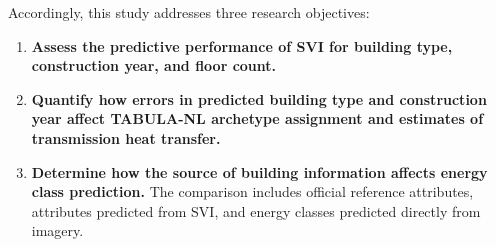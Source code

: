 Accordingly, this study addresses three research objectives:

\begin{enumerate}
	\item \textbf{Assess the predictive performance of \ac{SVI} for building type, construction year, and floor count.}

	\item \textbf{Quantify how errors in predicted building type and construction year affect TABULA-NL archetype assignment and estimates of transmission heat transfer.}

	\item \textbf{Determine how the source of building information affects energy class prediction.}
	      The comparison includes official reference attributes, attributes predicted from \ac{SVI}, and energy classes predicted directly from imagery.
\end{enumerate}
